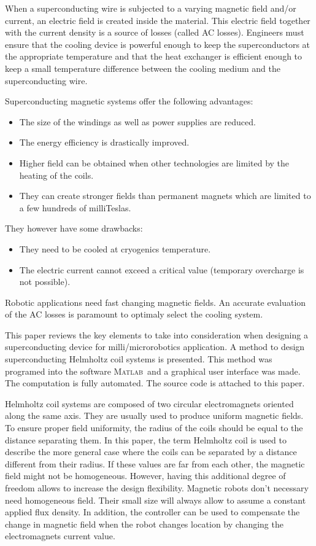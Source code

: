 \documentclass{ws-jmrr}
\newcommand{\MATLAB}{\textsc{Matlab}}
\begin{document}
\begin{multicols}{2}
When a superconducting wire is subjected to a varying magnetic field and/or current, an electric field is created inside the material. This electric field together with the current density is a source of losses (called AC losses). Engineers must ensure that the cooling device is powerful enough to keep the superconductors at the appropriate temperature and that the heat exchanger is efficient enough to keep a small temperature difference between the cooling medium and the superconducting wire.\par
Superconducting magnetic systems offer the following advantages:
\begin{itemize}
\item The size of the windings as well as power supplies are reduced.
\item The energy efficiency is drastically improved.
\item Higher field can be obtained when other technologies are limited by the heating of the coils.
\item They can create stronger fields than permanent magnets which are limited to a few hundreds of milliTeslas.
\end{itemize}
They however have some drawbacks:
\begin{itemize}
\item They need to be cooled at cryogenics temperature.
\item The electric current cannot exceed a critical value (temporary overcharge is not possible).
\end{itemize}
Robotic applications need fast changing magnetic fields. An accurate evaluation of the AC losses is paramount to optimaly select the cooling system.\par
This paper reviews the key elements to take into consideration when designing a superconducting device for milli/microrobotics application. A method to design superconducting Helmholtz coil systems is presented. This method was programed into the software \MATLAB ~and a graphical user interface was made. The computation is fully automated. The source code is attached to this paper.\par

Helmholtz coil systems are composed of two circular electromagnets oriented along the same axis. They are usually used to produce uniform magnetic fields. To ensure proper field uniformity, the radius of the coils should be equal to the distance separating them. In this paper, the term Helmholtz coil is used to describe the more general case where the coils can be separated by a distance different from their radius. If these values are far from each other, the magnetic field might not be homogeneous. However, having this additional degree of freedom allows to increase the design flexibility. Magnetic robots don't necessary need homogeneous field. Their small size will always allow to assume a constant applied flux density. In addition, the controller can be used to compensate the change in magnetic field when the robot changes location by changing the electromagnets current value.


\end{multicols}
\end{document}
